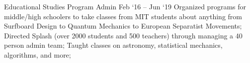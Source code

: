 \experience
    {Educational Studies Program}
    {Admin}
    {Feb `16 -- Jun `19}
    {
        Organized programs for middle/high schoolers to take classes from MIT students about
        anything from Surfboard Design to Quantum Mechanics to European Separatist Movements;
        Directed Splash (over 2000 students and 500 teachers) through managing a 40 person admin
        team;
        Taught classes on astronomy, statistical mechanics, algorithms, and more;
    }
